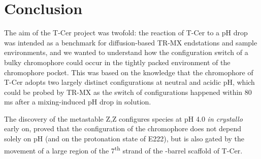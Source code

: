 


\section{Conclusion}

The aim of the T-Cer project was twofold: the reaction of T-Cer to a pH drop was intended as a benchmark for diffusion-based TR-MX endstations and sample environments, and we wanted to understand how the configuration switch of a bulky chromophore could occur in the tightly packed environment of the chromophore pocket. This was based on the knowledge that the chromophore of T-Cer adopts two largely distinct configurations at neutral and acidic pH, which could be probed by TR-MX as the switch of configurations happened within 80 ms after a mixing-induced pH drop in solution. 

The discovery of the metastable Z,Z configures species at pH 4.0 \textit{in crystallo} early on, proved that the configuration of the chromophore does not depend solely on pH (and on the protonation state of E222), but is also gated by the movement of a large region of the 7\textsuperscript{th} strand of the \textbeta-barrel scaffold of T-Cer. 

